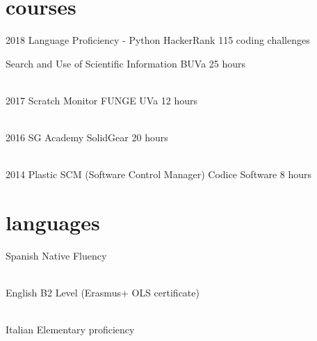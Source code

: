 \documentclass{friggeri-cv}
\begin{document}


  \section{courses}

    \begin{entrylist}

      \entry
      {2018}
      {Language Proficiency - Python}
      {HackerRank}
      {115 coding challenges}

      \entry
      {}
      {Search and Use of Scientific Information}
      {BUVa}
      {25 hours}

      \\
      \entry
      {2017}
      {Scratch Monitor}
      {FUNGE UVa}
      {12 hours}

      \\
      \entry
      {2016}
      {SG Academy}
      {SolidGear}
      {20 hours}

      \\
      \entry
      {2014}
      {Plastic SCM (Software Control Manager)}
      {Codice Software}
      {8 hours}

    \end{entrylist}



  \section{languages}

    \begin{entrylist}

      \entry
      {}
      {Spanish}
      {}
      {Native Fluency}

      \\
      \entry
      {}
      {English}
      {}
      {B2 Level (Erasmus+ OLS certificate)}

      \\
      \entry
      {}
      {Italian}
      {}
      {Elementary proficiency}

    \end{entrylist}
\end{document}
